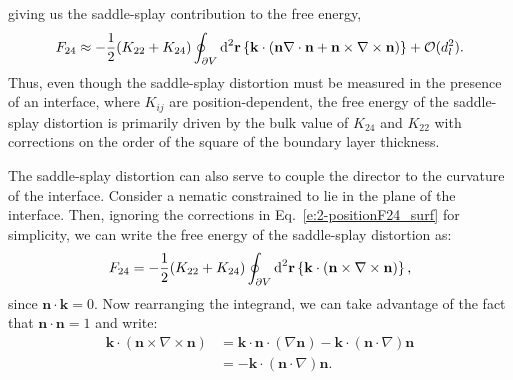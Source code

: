 giving us the saddle-splay contribution to the free energy,
\begin{equation}
  F_{24} \approx -\frac{1}{2}(K_{22} + K_{24})
  \oint_{\partial V}\textup{d}^2 \mathbf{r} \left \{\mathbf{k} \cdot (\mathbf{n} \nabla \cdot \mathbf{n} + \mathbf{n} \times \nabla \times \mathbf{n}) \right \} + \mathcal{O}(d_l^2). \label{e:2-positionF24_surf}
\end{equation}
Thus, even though the saddle-splay distortion must be measured in the presence of an interface, where $K_{ij}$ are position-dependent, the free energy of the saddle-splay distortion is primarily driven by the bulk value of $K_{24}$ and $K_{22}$ with corrections on the order of the square of the boundary layer thickness.

The saddle-splay distortion can also serve to couple the director to the curvature of the interface.
Consider a nematic constrained to lie in the plane of the interface.
Then, ignoring the corrections in Eq.~\ref{e:2-positionF24_surf} for simplicity, we can write the free energy of the saddle-splay distortion as:
\begin{equation}
  F_{24} = -\frac{1}{2}(K_{22} + K_{24})
  \oint_{\partial V}\textup{d}^2 \mathbf{r} \left \{\mathbf{k} \cdot ( \mathbf{n} \times \nabla \times \mathbf{n}) \right \},\label{e:2-K24PlanDegen}
\end{equation}
since $\mathbf{n} \cdot \mathbf{k} = 0$. Now rearranging the integrand, we can take advantage of the fact that $\mathbf{n} \cdot \mathbf{n}=1$ and write:
\begin{align}
  \mathbf{k} \cdot ( \mathbf{n} \times \nabla \times \mathbf{n}) &=\mathbf{k} \cdot \mathbf{n} \cdot (\nabla \mathbf{n}) -\mathbf{k} \cdot (\mathbf{n} \cdot \nabla)\mathbf{n}  \\
   &= -\mathbf{k} \cdot (\mathbf{n} \cdot \nabla)\mathbf{n}.\label{e:2-K24rearrange1}
\end{align}

